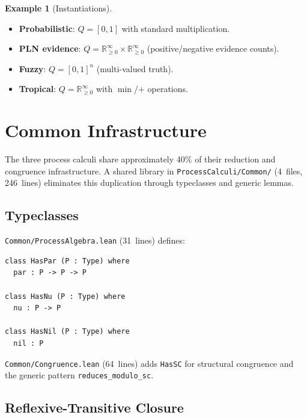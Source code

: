 \documentclass[11pt]{article}
\theoremstyle{definition}
\newtheorem{example}[theorem]{Example}
\theoremstyle{remark}
\begin{document}
\begin{example}[Instantiations]
\begin{itemize}[leftmargin=1.5em]
  \item \textbf{Probabilistic}: $Q = [0,1]$ with standard multiplication.
  \item \textbf{PLN evidence}: $Q = \mathbb{R}_{\geq 0}^\infty \times \mathbb{R}_{\geq 0}^\infty$ (positive/negative evidence counts).
  \item \textbf{Fuzzy}: $Q = [0,1]^n$ (multi-valued truth).
  \item \textbf{Tropical}: $Q = \mathbb{R}_{\geq 0}^\infty$ with $\min$/$+$ operations.
\end{itemize}
\end{example}


\section{Common Infrastructure}
\label{sec:common}

The three process calculi share approximately 40\% of their
reduction and congruence infrastructure.  A shared library in
\texttt{ProcessCalculi/Common/} (4~files, 246~lines) eliminates this
duplication through typeclasses and generic lemmas.

\subsection{Typeclasses}

\texttt{Common/ProcessAlgebra.lean} (31~lines) defines:

\begin{lstlisting}[caption={Shared process algebra typeclasses}]
class HasPar (P : Type) where
  par : P -> P -> P

class HasNu (P : Type) where
  nu : P -> P

class HasNil (P : Type) where
  nil : P
\end{lstlisting}

\noindent
\texttt{Common/Congruence.lean} (64~lines) adds \texttt{HasSC} for
structural congruence and the generic pattern
\texttt{reduces\_modulo\_sc}.

\subsection{Reflexive-Transitive Closure}
\end{document}
